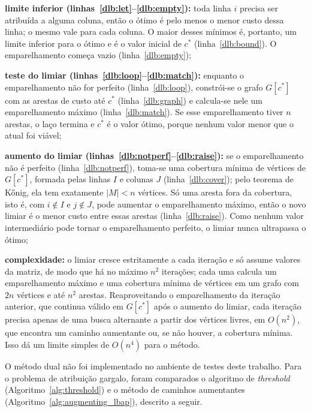 \begin{alineas}
    \item \textbf{limite inferior (linhas~\ref{dlb:let}--\ref{dlb:empty}):} toda linha $i$ precisa ser atribuída a alguma coluna, então o ótimo é pelo menos o menor custo dessa linha; o mesmo vale para cada coluna. O maior desses mínimos é, portanto, um limite inferior para o ótimo e é o valor inicial de $c^*$ (linha~\ref{dlb:bound}). O emparelhamento começa vazio (linha~\ref{dlb:empty});
    \item \textbf{teste do limiar (linhas~\ref{dlb:loop}--\ref{dlb:match}):} enquanto o emparelhamento não for perfeito (linha~\ref{dlb:loop}), constrói-se o grafo $G[c^*]$ com as arestas de custo até $c^*$ (linha~\ref{dlb:graph}) e calcula-se nele um emparelhamento máximo (linha~\ref{dlb:match}). Se esse emparelhamento tiver $n$ arestas, o laço termina e $c^*$ é o valor ótimo, porque nenhum valor menor que o atual foi viável;
    \item \textbf{aumento do limiar (linhas~\ref{dlb:notperf}--\ref{dlb:raise}):} se o emparelhamento não é perfeito (linha~\ref{dlb:notperf}), toma-se uma cobertura mínima de vértices de $G[c^*]$, formada pelas linhas $I$ e colunas $J$ (linha~\ref{dlb:cover}); pelo teorema de Kőnig, ela tem exatamente $|M| < n$ vértices. Só uma aresta fora da cobertura, isto é, com $i \notin I$ e $j \notin J$, pode aumentar o emparelhamento máximo, então o novo limiar é o menor custo entre essas arestas (linha~\ref{dlb:raise}). Como nenhum valor intermediário pode tornar o emparelhamento perfeito, o limiar nunca ultrapassa o ótimo;
    \item \textbf{complexidade:} o limiar cresce estritamente a cada iteração e só assume valores da matriz, de modo que há no máximo $n^2$ iterações; cada uma calcula um emparelhamento máximo e uma cobertura mínima de vértices em um grafo com $2n$ vértices e até $n^2$ arestas. Reaproveitando o emparelhamento da iteração anterior, que continua válido em $G[c^*]$ após o aumento do limiar, cada iteração precisa apenas de uma busca alternante a partir dos vértices livres, em $O(n^2)$, que encontra um caminho aumentante ou, se não houver, a cobertura mínima. Isso dá um limite simples de $O(n^4)$ para o método.
\end{alineas}

O método dual não foi implementado no ambiente de testes deste trabalho. Para o problema de atribuição gargalo, foram comparados o algoritmo de \textit{threshold} (Algoritmo~\ref{alg:threshold}) e o método de caminhos aumentantes (Algoritmo~\ref{alg:augmenting_lbap}), descrito a seguir.


